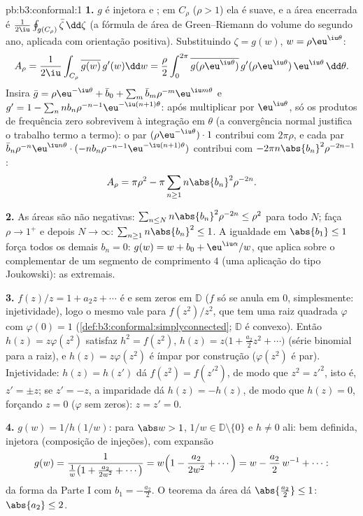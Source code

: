 \begin{solution}{pb:b3:conformal:1}
\textbf{1.} $g$ é injetora e ; em $C_\rho$
($\rho > 1$) ela é suave, e a área encerrada é
$\frac1{2\iu}\oint_{g(C_\rho)}\bar\zeta\,\dd\zeta$ (a fórmula de área de
Green--Riemann do volume do segundo ano, aplicada com orientação
positiva). Substituindo $\zeta = g(w)$, $w =
\rho\eu^{\iu\theta}$:
\[
A_\rho = \frac1{2\iu}\int_{C_\rho}\overline{g(w)}\,g'(w)\dd
w = \frac\rho2\int_0^{2\pi}\overline{g(\rho\eu^{\iu\theta})}
\,g'(\rho\eu^{\iu\theta})\,\eu^{\iu\theta}\,\dd\theta .
\]
Insira $\bar g = \rho\eu^{-\iu\theta} + \bar b_0 +
\sum_m\bar b_m\rho^{-m}\eu^{\iu m\theta}$ e $g' = 1 -
\sum_nnb_n\rho^{-n-1}\eu^{-\iu(n+1)\theta}$: após
multiplicar por $\eu^{\iu\theta}$, só os produtos de frequência zero
sobrevivem à integração em $\theta$ (a convergência normal
justifica o trabalho termo a termo): o par
$(\rho\eu^{-\iu\theta})\cdot1$ contribui com $2\pi\rho$, e
cada par $\bar b_n\rho^{-n}\eu^{\iu
n\theta}\cdot(-nb_n\rho^{-n-1}\eu^{-\iu(n+1)\theta})$
contribui com $-2\pi n\abs{b_n}^2\rho^{-2n-1}$:
\[
A_\rho = \pi\rho^2 - \pi\sum_{n\geq1}n\abs{b_n}^2\rho^{-2n}.
\]

\textbf{2.} As áreas são não negativas: $\sum_{n\leq
N}n\abs{b_n}^2\rho^{-2n} \leq \rho^2$ para todo $N$; faça
$\rho \to 1^+$ e depois $N \to \infty$:
$\sum_{n\geq1}n\abs{b_n}^2 \leq 1$. A igualdade em $\abs{b_1}
\leq 1$ força todos os demais $b_n = 0$: $g(w) = w + b_0 +
\eu^{\iu\alpha}/w$, que aplica sobre o complementar de um
segmento de comprimento $4$ (uma aplicação do tipo Joukowski): as extremais.

\textbf{3.} $f(z)/z = 1 + a_2z + \cdots$ é  e
sem zeros em $\mathbb D$ ($f$ só se anula em $0$, simplesmente:
injetividade), logo o mesmo vale para $f(z^2)/z^2$, que tem uma
raiz quadrada  $\varphi$ com $\varphi(0) = 1$
(\cref{def:b3:conformal:simplyconnected}; $\mathbb D$ é
convexo). Então $h(z) = z\varphi(z^2)$ satisfaz $h^2 =
f(z^2)$, $h(z) = z\bigl(1 + \frac{a_2}2z^2 + \cdots\bigr)$
(série binomial para a raiz), e $h(z) = z\varphi(z^2)$ é
ímpar por construção ($\varphi(z^2)$ é par). Injetividade: $h(z) = h(z')$ dá $f(z^2) =
f(z'^2)$, de modo que $z^2 = z'^2$, isto é, $z' = \pm z$; se $z' = -z$,
a imparidade dá $h(z) = -h(z)$, de modo que $h(z) = 0$, forçando $z
= 0$ ($\varphi$ sem zeros): $z = z' = 0$.

\textbf{4.} $g(w) = 1/h(1/w)$: para $\abs w > 1$, $1/w \in
\mathbb D\setminus\{0\}$ e $h \neq 0$ ali: bem definida,
injetora (composição de injeções), com expansão
\[
g(w) = \frac{1}{\frac1w\bigl(1 + \frac{a_2}{2w^2} +
\cdots\bigr)} = w\Bigl(1 - \frac{a_2}{2w^2} + \cdots\Bigr)
= w - \frac{a_2}{2}\,w^{-1} + \cdots :
\]
da forma da Parte I com $b_1 = -\frac{a_2}2$. O teorema da área
dá $\abs{\frac{a_2}2} \leq 1$: $\abs{a_2} \leq 2$.


\end{solution}
